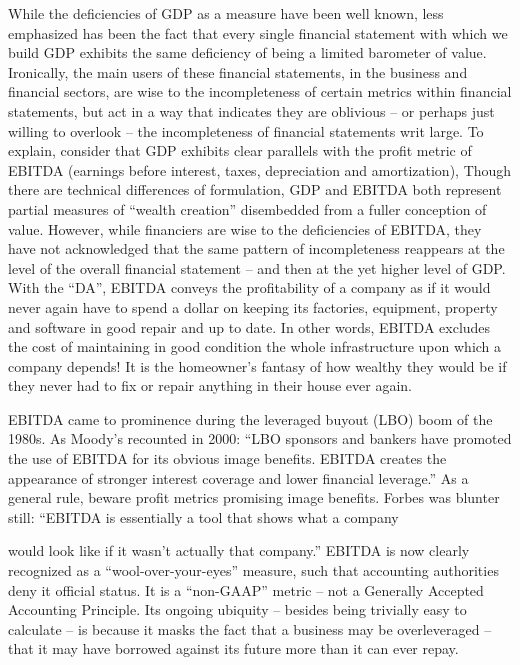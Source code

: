 \documentclass[
]{book}
\begin{document}
While the deficiencies of GDP as a measure have been well known, less emphasized has
been the fact that every single financial statement with which we build GDP exhibits the same
deficiency of being a limited barometer of value. Ironically, the main users of these financial
statements, in the business and financial sectors, are wise to the incompleteness of certain
metrics within financial statements, but act in a way that indicates they are oblivious -- or
perhaps just willing to overlook -- the incompleteness of financial statements writ large.
To explain, consider that GDP exhibits clear parallels with the profit metric of EBITDA
(earnings before interest, taxes, depreciation and amortization), Though there are technical
differences of formulation, GDP and EBITDA both represent partial measures of ``wealth
creation'' disembedded from a fuller conception of value. However, while financiers are wise
to the deficiencies of EBITDA, they have not acknowledged that the same pattern of
incompleteness reappears at the level of the overall financial statement -- and then at the yet
higher level of GDP.
With the ``DA'', EBITDA conveys the profitability of a company as if it would never again have
to spend a dollar on keeping its factories, equipment, property and software in good repair
and up to date. In other words, EBITDA excludes the cost of maintaining in good condition the
whole infrastructure upon which a company depends! It is the homeowner's fantasy of how
wealthy they would be if they never had to fix or repair anything in their house ever again.

EBITDA came to prominence during the leveraged buyout (LBO) boom of the 1980s. As
Moody's recounted in 2000: ``LBO sponsors and bankers have promoted the use of EBITDA
for its obvious image benefits. EBITDA creates the appearance of stronger interest coverage
and lower financial leverage.'' As a general rule, beware profit metrics promising image
benefits. Forbes was blunter still: ``EBITDA is essentially a tool that shows what a company

would look like if it wasn't actually that company.''
EBITDA is now clearly recognized as a ``wool-over-your-eyes'' measure, such that accounting
authorities deny it official status. It is a ``non-GAAP'' metric -- not a Generally Accepted
Accounting Principle. Its ongoing ubiquity -- besides being trivially easy to calculate -- is
because it masks the fact that a business may be overleveraged -- that it may have borrowed
against its future more than it can ever repay.
\end{document}
